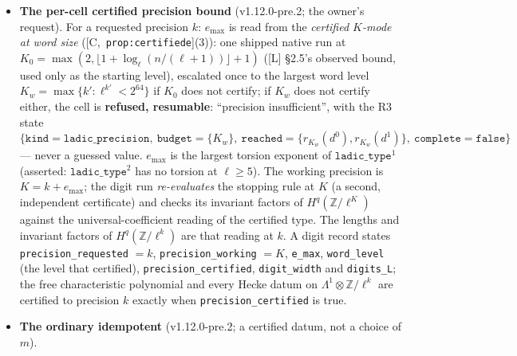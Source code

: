 \documentclass[11pt]{article}
\theoremstyle{remark}
\newcommand{\Z}{\mathbb{Z}}
\newcommand{\HA}[1]{[C,~\texttt{#1}]}      %
\begin{document}
\begin{itemize}
  division-free characteristic polynomial of the free block, as in (d)). \emph{Honoured} at a digit
  cell: the lengths and invariant factors of $H^q(\Z/\ell^{k})$, the $K$-mode ($r_K$ at the
  working level, \texttt{ladic\_type\_certified}, $\texttt{ladic\_type}^q$), the free characteristic
  polynomial and the free block of $A^{(1)}(T_p)$ at precision $k$, and the ordinary idempotent
  (below). \emph{Refused by name at a digit cell}, exit~$5$ (members of (b1)'s closure that the
  route does not reach in slot~11): the Bockstein and the reduction maps of (d) other than
  truncation, the boundary and the cone ((f)), the pairing and the contragredient, the extension
  driver, $T_{p^r}$ with $r\ge2$, the operator family and the decompositions, and every stored
  basis as a console \texttt{Matrix}.
\item \textbf{The per-cell certified precision bound} (v1.12.0-pre.2; the owner's request). For a
  requested precision $k$: $e_{\max}$ is read from the \emph{certified $K$-mode at word size}
  (\HA{prop:certifiede}(3)): one shipped native run at
  $K_0=\max(2,\lfloor1+\log_\ell(n/(\ell+1))\rfloor+1)$ ([L] \S2.5's observed bound, used only as the
  starting level), escalated once to the largest word level $K_w=\max\{k':\ell^{k'}<2^{64}\}$ if $K_0$
  does not certify; if $K_w$ does not certify either, the cell is \textbf{refused, resumable}:
  ``precision insufficient'', with the R3 state $\{\texttt{kind}=\texttt{ladic\_precision},\
  \texttt{budget}=\{K_w\},\ \texttt{reached}=\{r_{K_w}(d^0),r_{K_w}(d^1)\},\
  \texttt{complete}=\texttt{false}\}$ --- never a guessed value. $e_{\max}$ is the largest torsion
  exponent of $\texttt{ladic\_type}^1$ (asserted: $\texttt{ladic\_type}^2$ has no torsion at
  $\ell\ge5$). The working precision is $K=k+e_{\max}$; the digit run \emph{re-evaluates} the
  stopping rule at $K$ (a second, independent certificate) and checks its invariant factors of
  $H^q(\Z/\ell^{K})$ against the universal-coefficient reading of the certified type. The lengths
  and invariant factors of $H^q(\Z/\ell^{k})$ are that reading at $k$. A digit record states
  \texttt{precision\_requested} $=k$, \texttt{precision\_working} $=K$, \texttt{e\_max},
  \texttt{word\_level} (the level that certified), \texttt{precision\_certified},
  \texttt{digit\_width} and \texttt{digits\_L}; the free characteristic polynomial and every Hecke
  datum on $\Lambda^1\otimes\Z/\ell^{k}$ are certified to precision $k$ exactly when
  \texttt{precision\_certified} is true.
\item \textbf{The ordinary idempotent} (v1.12.0-pre.2; a certified datum, not a choice of $m$).

\end{itemize}
\end{document}
